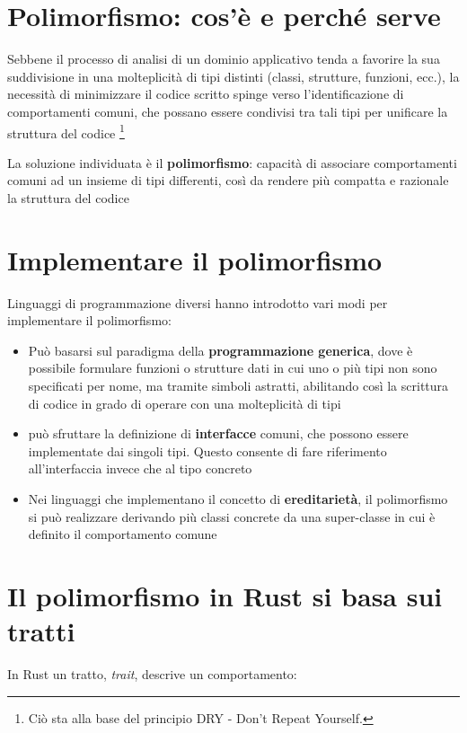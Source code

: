 \section{Polimorfismo: cos'è e perché serve}
Sebbene il processo di analisi di un dominio applicativo tenda a favorire la sua
suddivisione in una molteplicità di tipi distinti (classi, strutture, funzioni,
ecc.), la necessità di minimizzare il codice scritto spinge verso
l'identificazione di comportamenti comuni, che possano essere condivisi tra tali
tipi per unificare la struttura del codice \footnote{Ciò sta alla base del principio DRY - Don't Repeat Yourself.}



La soluzione individuata è il \textbf{polimorfismo}: capacità di associare comportamenti
comuni ad un insieme di tipi differenti, così da rendere più compatta e
razionale la struttura del codice

\section{Implementare il polimorfismo}

Linguaggi di programmazione diversi hanno introdotto vari modi per implementare
il polimorfismo:

\begin{itemize}
  \item Può basarsi sul paradigma della \textbf{programmazione generica}, dove è
        possibile formulare funzioni o strutture dati in cui uno o più tipi non sono
        specificati per nome, ma tramite simboli astratti, abilitando così la
        scrittura di codice in grado di operare con una molteplicità di tipi
  \item può sfruttare la definizione di \textbf{interfacce} comuni, che possono essere
        implementate dai singoli tipi. Questo consente di fare riferimento
        all'interfaccia invece che al tipo concreto
  \item Nei linguaggi che implementano il concetto di \textbf{ereditarietà}, il
        polimorfismo si può realizzare derivando più classi concrete da una
        super-classe in cui è definito il comportamento comune
\end{itemize}

\section{Il polimorfismo in Rust si basa sui tratti}
In Rust un tratto, \textit{trait}, descrive un comportamento:

